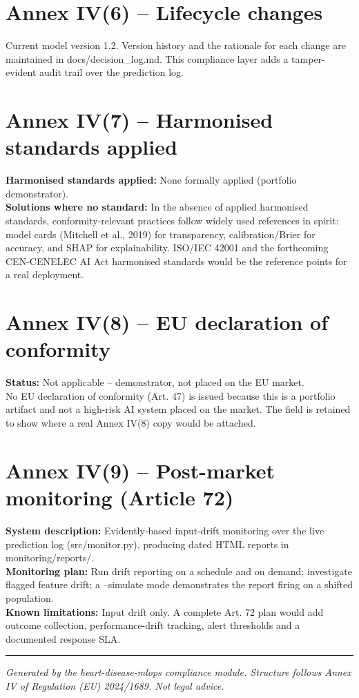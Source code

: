 \documentclass[11pt,a4paper]{article}
\begin{document}
\section*{Annex IV(6) -- Lifecycle changes}
Current model version 1.2. Version history and the rationale for each change are maintained in docs/decision\_log.md. This compliance layer adds a tamper-evident audit trail over the prediction log.
\section*{Annex IV(7) -- Harmonised standards applied}
\textbf{Harmonised standards applied:} None formally applied (portfolio demonstrator).\\

\textbf{Solutions where no standard:} In the absence of applied harmonised standards, conformity-relevant practices follow widely used references in spirit: model cards (Mitchell et al., 2019) for transparency, calibration/Brier for accuracy, and SHAP for explainability. ISO/IEC 42001 and the forthcoming CEN-CENELEC AI Act harmonised standards would be the reference points for a real deployment.\\

\section*{Annex IV(8) -- EU declaration of conformity}
\textbf{Status:} Not applicable -- demonstrator, not placed on the EU market.\\

No EU declaration of conformity (Art. 47) is issued because this is a portfolio artifact and not a high-risk AI system placed on the market. The field is retained to show where a real Annex IV(8) copy would be attached.
\section*{Annex IV(9) -- Post-market monitoring (Article 72)}
\textbf{System description:} Evidently-based input-drift monitoring over the live prediction log (src/monitor.py), producing dated HTML reports in monitoring/reports/.\\

\textbf{Monitoring plan:} Run drift reporting on a schedule and on demand; investigate flagged feature drift; a --simulate mode demonstrates the report firing on a shifted population.\\

\textbf{Known limitations:} Input drift only. A complete Art. 72 plan would add outcome collection, performance-drift tracking, alert thresholds and a documented response SLA.\\

\vfill\hrule\vspace{4pt}
\textit{\small Generated by the heart-disease-mlops compliance module. Structure follows Annex IV of Regulation (EU) 2024/1689. Not legal advice.}
\end{document}
